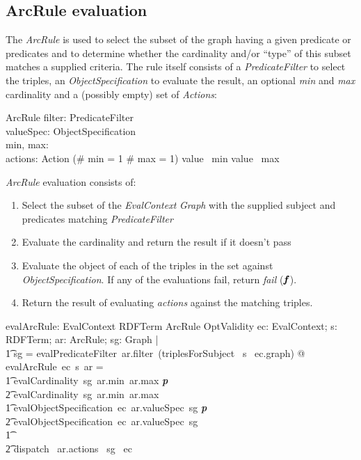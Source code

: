 \documentclass[fuzz]{llncs}
\def\pass{\textbf{\textit{p}}}
\def\fail{\textbf{\textit{f}}}
\def\zc{\textit}
\begin{document}
\subsection{ArcRule evaluation}
The \zc{ArcRule} is used to select the subset of the graph having a given predicate or
predicates and to determine whether the cardinality and/or ``type'' of this subset matches
a supplied criteria. The rule itself consists of a \zc{PredicateFilter} to select the triples,
 an \zc{ObjectSpecification} to evaluate the result, an optional \zc{min} and \zc{max}
 cardinality and a (possibly empty) set of \zc{Actions}:
\begin{schema}{ArcRule}
   filter: PredicateFilter \\
   valueSpec: ObjectSpecification \\
   min, max: \optional[\nat] \\
   actions: \power Action
\where
   (\# min = 1 \land \# max = 1) \implies value~ min \leq value~ max
\end{schema}
\zc{ArcRule} evaluation consists of:
\begin{enumerate}
\item Select the subset of the \zc{EvalContext} \zc{Graph} with the supplied subject and predicates matching  \zc{PredicateFilter}
\item Evaluate the cardinality and return the result if it doesn't pass
\item Evaluate the object of each of the triples in the set against \zc{ObjectSpecification}.  If any of the evaluations fail, return \zc{fail} ($\fail$).
\item Return the result of evaluating \zc{actions} against the matching triples.
\end{enumerate}
\begin{gendef}
   evalArcRule: EvalContext \fun RDFTerm \fun ArcRule \fun OptValidity
\where
   \forall ec: EvalContext; s: RDFTerm; ar: ArcRule; sg: Graph  | \\ 
\t1 sg = evalPredicateFilter~ar.filter~(triplesForSubject~ s~ ec.graph) @ \\
evalArcRule~ec~s~ar = \\
\t1 \IF evalCardinality~sg~ar.min~ar.max \neq \pass \\
\t2 \THEN evalCardinality~sg~ar.min~ar.max \\
\t1 \ELSE \IF evalObjectSpecification~ec~ar.valueSpec~sg \neq \pass \\
\t2 \THEN evalObjectSpecification~ec~ar.valueSpec~sg \\
\t1 \ELSE \\
\t2  dispatch~ ar.actions~ sg~ ec 
\end{gendef}
\end{document}
